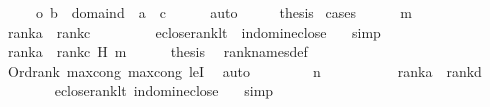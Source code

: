 \begin{isabellebody}
\ \ \ \ {\isacharbar}{\kern0pt}\ {\isacharparenleft}{\kern0pt}o{\isacharparenright}{\kern0pt}\ {\isachardoublequoteopen}b\ {\isasymin}\ domain{\isacharparenleft}{\kern0pt}d{\isacharparenright}{\kern0pt}\ {\isasymand}\ a\ {\isacharequal}{\kern0pt}\ c{\isachardoublequoteclose}\isanewline
\ \ \ \ \isamarkupfalse%
\ auto\isanewline
\ \ \isamarkupfalse%
\ \isamarkupfalse%
\ {\isacharquery}{\kern0pt}thesis\ \isamarkupfalse%
{\isacharparenleft}{\kern0pt}cases{\isacharparenright}{\kern0pt}\isanewline
\ \ \ \ \isamarkupfalse%
\ m\isanewline
\ \ \ \ \isamarkupfalse%
\ \isanewline
\ \ \ \ \isamarkupfalse%
\ {\isachardoublequoteopen}rank{\isacharparenleft}{\kern0pt}a{\isacharparenright}{\kern0pt}\ {\isacharless}{\kern0pt}\ rank{\isacharparenleft}{\kern0pt}c{\isacharparenright}{\kern0pt}{\isachardoublequoteclose}\ \isanewline
\ \ \ \ \ \ \isamarkupfalse%
\ eclose{\isacharunderscore}{\kern0pt}rank{\isacharunderscore}{\kern0pt}lt\ \ in{\isacharunderscore}{\kern0pt}dom{\isacharunderscore}{\kern0pt}in{\isacharunderscore}{\kern0pt}eclose\ \ \isamarkupfalse%
\ simp\isanewline
\ \ \ \ \isamarkupfalse%
\ {\isacartoucheopen}rank{\isacharparenleft}{\kern0pt}a{\isacharparenright}{\kern0pt}\ {\isacharless}{\kern0pt}\ rank{\isacharparenleft}{\kern0pt}c{\isacharparenright}{\kern0pt}{\isacartoucheclose}\ H\ m\isanewline
\ \ \ \ \isamarkupfalse%
\ {\isacharquery}{\kern0pt}thesis\ \isamarkupfalse%
\ rank{\isacharunderscore}{\kern0pt}names{\isacharunderscore}{\kern0pt}def\ \isamarkupfalse%
\ Ord{\isacharunderscore}{\kern0pt}rank\ max{\isacharunderscore}{\kern0pt}cong\ max{\isacharunderscore}{\kern0pt}cong{}\ leI\ \isamarkupfalse%
\ auto\isanewline
\ \ \isamarkupfalse%
\isanewline
\ \ \ \ \isamarkupfalse%
\ n\isanewline
\ \ \ \ \isamarkupfalse%
\isanewline
\ \ \ \ \isamarkupfalse%
\ {\isachardoublequoteopen}rank{\isacharparenleft}{\kern0pt}a{\isacharparenright}{\kern0pt}\ {\isacharless}{\kern0pt}\ rank{\isacharparenleft}{\kern0pt}d{\isacharparenright}{\kern0pt}{\isachardoublequoteclose}\isanewline
\ \ \ \ \ \ \isamarkupfalse%
\ eclose{\isacharunderscore}{\kern0pt}rank{\isacharunderscore}{\kern0pt}lt\ in{\isacharunderscore}{\kern0pt}dom{\isacharunderscore}{\kern0pt}in{\isacharunderscore}{\kern0pt}eclose\ \ \isamarkupfalse%
\ simp\isanewline

\end{isabellebody}
